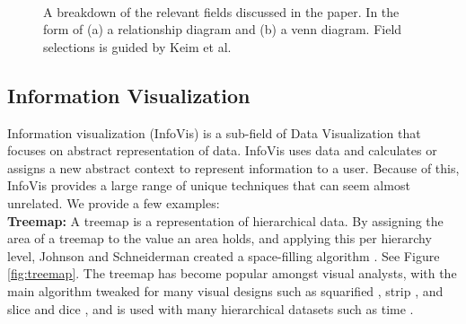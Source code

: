 \begin{figure}[t]
\centering 
{}~
\caption{A breakdown of the relevant fields discussed in the paper. In the form of (a) a relationship diagram and (b) a venn diagram.  Field selections is guided by Keim et al.\ \cite{ward2015interactive}} \label{fig:breakdown} 
\end{figure}

\subsection{Information Visualization}
Information visualization (InfoVis) is a sub-field of Data Visualization that focuses on abstract representation of data. InfoVis uses data and calculates or assigns a new abstract context to represent information to a user. Because of this, InfoVis provides a large range of unique techniques that can seem almost unrelated. We provide a few examples:\\
\textbf{Treemap: }A treemap is a representation of hierarchical data. By assigning the area of a treemap to the value an area holds, and applying this per hierarchy level, Johnson and Schneiderman created a space-filling algorithm \cite{johnson1991tree}. See Figure \ref{fig:treemap}. The treemap has become popular amongst visual analysts, with the main algorithm tweaked for many visual designs such as squarified \cite{bruls2000squarified}, strip \cite{bederson2002ordered}, and slice and dice \cite{shneiderman2001ordered}, and is used with many hierarchical datasets such as time \cite{roberts2016interactive}.

